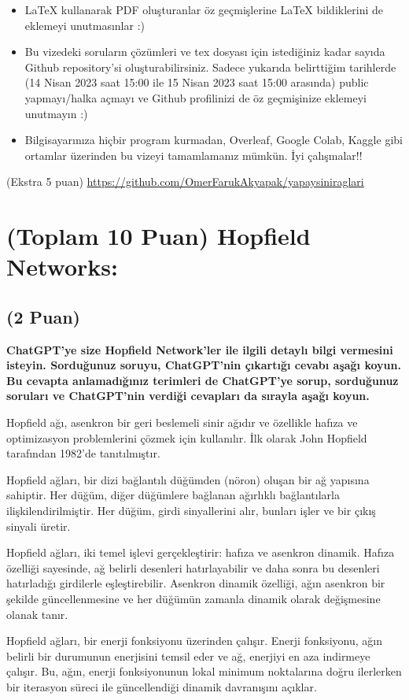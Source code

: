 \documentclass[11pt]{article}
\begin{document}
\begin{itemize}
    \item LaTeX kullanarak PDF oluşturanlar öz geçmişlerine LaTeX bildiklerini de eklemeyi unutmasınlar :)
    \item Bu vizedeki soruların çözümleri ve tex dosyası için istediğiniz kadar sayıda Github repository'si oluşturabilirsiniz. Sadece yukarıda belirttiğim tarihlerde (14 Nisan 2023 saat 15:00 ile 15 Nisan 2023 saat 15:00 arasında) public yapmayı/halka açmayı ve Github profilinizi de öz geçmişinize eklemeyi unutmayın :)
    \item Bilgisayarınıza hiçbir program kurmadan, Overleaf, Google Colab, Kaggle gibi ortamlar üzerinden bu vizeyi tamamlamanız mümkün. İyi çalışmalar!!
\end{itemize}

(Ekstra 5 puan) \url{https://github.com/OmerFarukAkyapak/yapaysiniraglari}

\newpage
\section{(Toplam 10 Puan) Hopfield Networks:}

\subsection{(2 Puan)} \textbf{ChatGPT’ye size Hopfield Network’ler ile ilgili detaylı bilgi vermesini isteyin. Sorduğunuz soruyu, ChatGPT'nin çıkartığı cevabı aşağı koyun. Bu cevapta anlamadığınız terimleri de ChatGPT’ye sorup, sorduğunuz soruları ve ChatGPT’nin verdiği cevapları da sırayla aşağı koyun.}

Hopfield ağı, asenkron bir geri beslemeli sinir ağıdır ve özellikle hafıza ve optimizasyon problemlerini çözmek için kullanılır. İlk olarak John Hopfield tarafından 1982'de tanıtılmıştır.

Hopfield ağları, bir dizi bağlantılı düğümden (nöron) oluşan bir ağ yapısına sahiptir. Her düğüm, diğer düğümlere bağlanan ağırlıklı bağlantılarla ilişkilendirilmiştir. Her düğüm, girdi sinyallerini alır, bunları işler ve bir çıkış sinyali üretir.

Hopfield ağları, iki temel işlevi gerçekleştirir: hafıza ve asenkron dinamik. Hafıza özelliği sayesinde, ağ belirli desenleri hatırlayabilir ve daha sonra bu desenleri hatırladığı girdilerle eşleştirebilir. Asenkron dinamik özelliği, ağın asenkron bir şekilde güncellenmesine ve her düğümün zamanla dinamik olarak değişmesine olanak tanır.

Hopfield ağları, bir enerji fonksiyonu üzerinden çalışır. Enerji fonksiyonu, ağın belirli bir durumunun enerjisini temsil eder ve ağ, enerjiyi en aza indirmeye çalışır. Bu, ağın, enerji fonksiyonunun lokal minimum noktalarına doğru ilerlerken bir iterasyon süreci ile güncellendiği dinamik davranışını açıklar.
\end{document}
